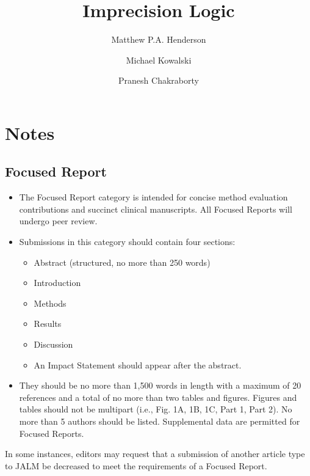 \documentclass[review]{elsarticle}
\date{}
\title{}
\begin{document}
\makeatletter
\newcommand{\citeprocitem}[2]{\hyper@linkstart{cite}{citeproc_bib_item_#1}#2\hyper@linkend}
\makeatother



\begin{frontmatter}
\title{Imprecision Logic}
\author[NSO, UoO]{Matthew P.A. Henderson}
\author[NSO]{Michael Kowalski}
\author[NSO, UO]{Pranesh Chakraborty}
\address[NSO]{Newborn Screening Ontario, Children's Hospital of Eastern Ontario,Canada}
\address[UoO]{Department of Medicine, University of Ottawa,Canada} 
\end{frontmatter}

\section*{Notes}
\label{sec:org1061138}
\subsection*{Focused Report}
\label{sec:org21b4f83}
\begin{itemize}
\item The Focused Report category is intended for concise method
evaluation contributions and succinct clinical manuscripts. All
Focused Reports will undergo peer review.
\item Submissions in this category should contain four sections:
\begin{itemize}
\item Abstract (structured, no more than 250 words)
\item Introduction
\item Methods
\item Results
\item Discussion
\item An Impact Statement should appear after the abstract.
\end{itemize}
\item They should be no more than 1,500 words in length with a maximum of
20 references and a total of no more than two tables and
figures. Figures and tables should not be multipart (i.e., Fig. 1A,
1B, 1C, Part 1, Part 2). No more than 5 authors should be
listed. Supplemental data are permitted for Focused Reports.
\end{itemize}

In some instances, editors may request that a submission of another article type to JALM be decreased to meet the requirements of a Focused Report.
\end{document}
